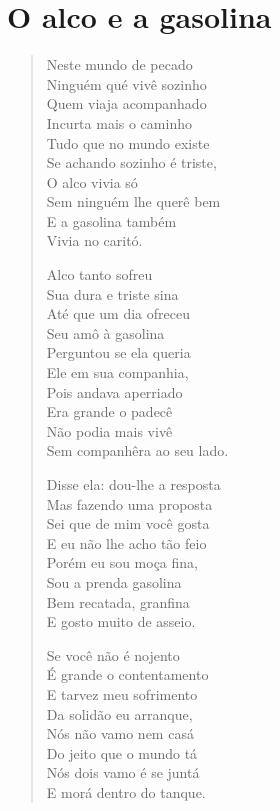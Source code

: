 \chapter{O alco e a gasolina}

\begin{verse}
Neste mundo de pecado\\
Ninguém qué vivê sozinho\\
Quem viaja acompanhado\\
Incurta mais o caminho\\
Tudo que no mundo existe\\
Se achando sozinho é triste,\\
O alco vivia só\\
Sem ninguém lhe querê bem\\
E a gasolina também\\
Vivia no caritó.

Alco tanto sofreu\\
Sua dura e triste sina\\
Até que um dia ofreceu\\
Seu amô à gasolina\\
Perguntou se ela queria\\
Ele em sua companhia,\\
Pois andava aperriado\\
Era grande o padecê\\
Não podia mais vivê\\
Sem companhêra ao seu lado.

Disse ela: dou-lhe a resposta\\
Mas fazendo uma proposta\\
Sei que de mim você gosta\\
E eu não lhe acho tão feio\\
Porém eu sou moça fina,\\
Sou a prenda gasolina\\
Bem recatada, granfina\\
E gosto muito de asseio.

Se você não é nojento\\
É grande o contentamento\\
E tarvez meu sofrimento\\
Da solidão eu arranque,\\
Nós não vamo nem casá\\
Do jeito que o mundo tá\\
Nós dois vamo é se juntá\\
E morá dentro do tanque.


\end{verse}
